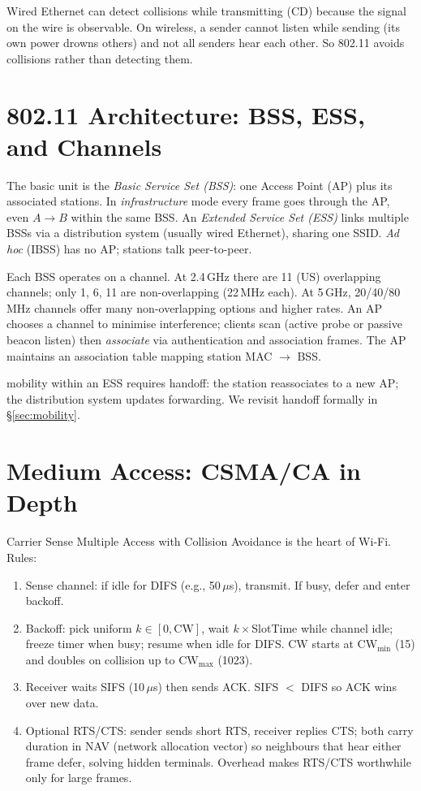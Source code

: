 Wired Ethernet can detect collisions while transmitting (CD) because the signal on the wire is observable. On wireless, a sender cannot listen while sending (its own power drowns others) and not all senders hear each other. So 802.11 avoids collisions rather than detecting them.

\section{802.11 Architecture: BSS, ESS, and Channels}\label{sec:802-arch}
The basic unit is the \emph{Basic Service Set (BSS)}: one Access Point (AP) plus its associated stations. In \emph{infrastructure} mode every frame goes through the AP, even $A\to B$ within the same BSS. An \emph{Extended Service Set (ESS)} links multiple BSSs via a distribution system (usually wired Ethernet), sharing one SSID. \emph{Ad hoc} (IBSS) has no AP; stations talk peer-to-peer.

Each BSS operates on a channel. At 2.4\,GHz there are 11 (US) overlapping channels; only 1, 6, 11 are non-overlapping (22\,MHz each). At 5\,GHz, 20/40/80\,MHz channels offer many non-overlapping options and higher rates. An AP chooses a channel to minimise interference; clients scan (active probe or passive beacon listen) then \emph{associate} via authentication and association frames. The AP maintains an association table mapping station MAC $\to$ BSS.

mobility within an ESS requires handoff: the station reassociates to a new AP; the distribution system updates forwarding. We revisit handoff formally in \S\ref{sec:mobility}.

\section{Medium Access: CSMA/CA in Depth}\label{sec:csma-ca}
Carrier Sense Multiple Access with Collision Avoidance is the heart of Wi-Fi. Rules:

\begin{enumerate}[itemsep=0.3em]
    \item Sense channel: if idle for DIFS (e.g., 50\,$\mu$s), transmit. If busy, defer and enter backoff.
    \item Backoff: pick uniform $k\in[0,\mathrm{CW}]$, wait $k\times$SlotTime while channel idle; freeze timer when busy; resume when idle for DIFS. CW starts at $\mathrm{CW}_{\min}$ (15) and doubles on collision up to $\mathrm{CW}_{\max}$ (1023).
    \item Receiver waits SIFS (10\,$\mu$s) then sends ACK. SIFS $<$ DIFS so ACK wins over new data.
    \item Optional RTS/CTS: sender sends short RTS, receiver replies CTS; both carry duration in NAV (network allocation vector) so neighbours that hear either frame defer, solving hidden terminals. Overhead makes RTS/CTS worthwhile only for large frames.
\end{enumerate}

